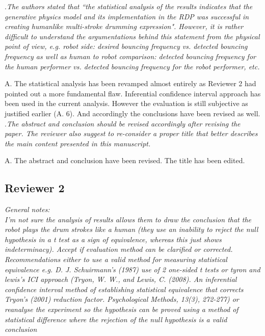 \documentclass[]{article}
\begin{document}
.\textit{The authors stated that ``the statistical analysis of the results indicates that the generative physics model and its implementation in the RDP
	was successful in creating humanlike multi-stroke drumming expression". However, it is rather difficult to understand the argumentations behind
	this statement from the physical point of view, e.g. robot side: desired bouncing frequency vs. detected bouncing frequency as well as
	human to robot comparison: detected bouncing frequency for the human performer vs. detected bouncing frequency for the robot performer, etc.}

\noindent A. The statistical analysis has been revamped almost entirely as Reviewer 2 had pointed out a more fundamental flaw. Inferential confidence interval approach has been used in the current analysis. However the evaluation is still subjective as justified earlier (A. 6). And accordingly the conclusions have been revised as well. \\

.\textit{The abstract and conclusion should be revised accordingly after revising the paper.
	The reviewer also suggest to re-consider a proper title that better describes the main content presented in this manuscript.}

\noindent A. The abstract and conclusion have been revised. The title has been edited. \\

\subsection*{Reviewer 2}

\noindent\textit{General notes:\\
	I'm not sure the analysis of results allows them to draw the conclusion that the robot plays the drum strokes like a human (they use an inability to reject the null hypothesis in a t test as a sign of equivalence, whereas this just shows indeterminacy). Accept if evaluation method can be clarified or corrected. Recommendations either to use a valid method for measuring statistical equivalence e.g. D. J. Schuirmann's (1987) use of 2 one-sided t tests or tyron and lewis's ICI approach (Tryon, W. W., and Lewis, C. (2008). An inferential confidence interval method of establishing statistical equivalence that corrects Tryon's (2001) reduction factor. Psychological Methods, 13(3), 272-277) or reanalyse the experiment so the hypothesis can be proved using a method of statistical difference where the rejection of the null hypothesis is a valid conclusion
}
\end{document}
